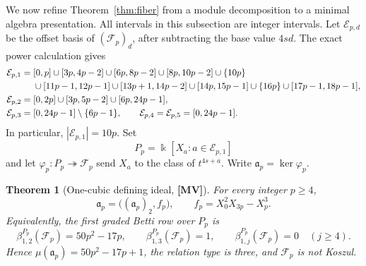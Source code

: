 \documentclass[11pt]{article}
\newtheorem{theorem}{Theorem}[section]
\theoremstyle{definition}
\theoremstyle{remark}
\newcommand{\kfield}{\Bbbk}
\begin{document}
We now refine Theorem~\ref{thm:fiber} from a module decomposition to a minimal algebra
presentation. All intervals in this subsection are integer intervals. Let
\(\mathcal E_{p,d}\) be the offset basis of \((\mathcal F_p)_d\), after subtracting the base
value \(4sd\). The exact power calculation gives
\begin{align}
\mathcal E_{p,1}={}&[0,p]\cup[3p,4p-2]\cup[6p,8p-2]\cup[8p,10p-2]
 \cup\{10p\}\notag\\
&\cup[11p-1,12p-1]\cup[13p+1,14p-2]\cup[14p,15p-1]
 \cup\{16p\}\cup[17p-1,18p-1],\label{eq:fiber-e1}\\
\mathcal E_{p,2}={}&[0,2p]\cup[3p,5p-2]\cup[6p,24p-1],\notag\\
\mathcal E_{p,3}={}&[0,24p-1]\setminus\{6p-1\},\qquad
\mathcal E_{p,4}=\mathcal E_{p,5}=[0,24p-1].\label{eq:fiber-cumulative}
\end{align}
In particular, \(|\mathcal E_{p,1}|=10p\). Set
\[
P_p=\kfield[X_a:a\in\mathcal E_{p,1}]
\]
and let \(\varphi_p:P_p\twoheadrightarrow\mathcal F_p\) send \(X_a\) to the class of
\(t^{4s+a}\). Write \(\mathfrak a_p=\ker\varphi_p\).

\begin{theorem}[One-cubic defining ideal, {\bf[MV]}]
\label{thm:presentation}
For every integer \(p\ge4\),
\[
\mathfrak a_p=\bigl((\mathfrak a_p)_2,
f_p\bigr),\qquad
f_p=X_0^2X_{3p}-X_p^3.
\]
Equivalently, the first graded Betti row over \(P_p\) is
\[
\beta^{P_p}_{1,2}(\mathcal F_p)=50p^2-17p,\qquad
\beta^{P_p}_{1,3}(\mathcal F_p)=1,\qquad
\beta^{P_p}_{1,j}(\mathcal F_p)=0\quad(j\ge4).
\]
Hence \(\mu(\mathfrak a_p)=50p^2-17p+1\), the relation type is three, and
\(\mathcal F_p\) is not Koszul.
\end{theorem}
\end{document}
